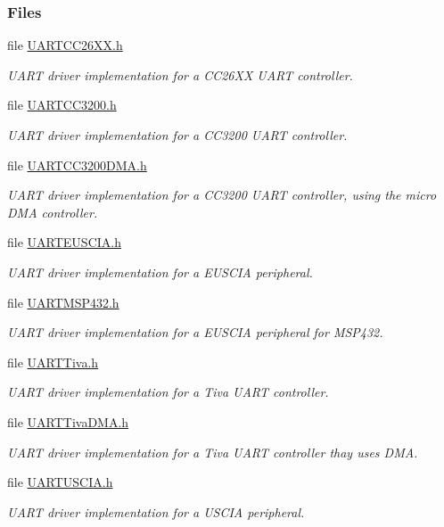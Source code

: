 \subsubsection*{Files}
\begin{DoxyCompactItemize}
\item 
file \hyperlink{_u_a_r_t_c_c26_x_x_8h}{U\+A\+R\+T\+C\+C26\+X\+X.\+h}
\begin{DoxyCompactList}\small\item\em U\+A\+R\+T driver implementation for a C\+C26\+X\+X U\+A\+R\+T controller. \end{DoxyCompactList}\item 
file \hyperlink{_u_a_r_t_c_c3200_8h}{U\+A\+R\+T\+C\+C3200.\+h}
\begin{DoxyCompactList}\small\item\em U\+A\+R\+T driver implementation for a C\+C3200 U\+A\+R\+T controller. \end{DoxyCompactList}\item 
file \hyperlink{_u_a_r_t_c_c3200_d_m_a_8h}{U\+A\+R\+T\+C\+C3200\+D\+M\+A.\+h}
\begin{DoxyCompactList}\small\item\em U\+A\+R\+T driver implementation for a C\+C3200 U\+A\+R\+T controller, using the micro D\+M\+A controller. \end{DoxyCompactList}\item 
file \hyperlink{_u_a_r_t_e_u_s_c_i_a_8h}{U\+A\+R\+T\+E\+U\+S\+C\+I\+A.\+h}
\begin{DoxyCompactList}\small\item\em U\+A\+R\+T driver implementation for a E\+U\+S\+C\+I\+A peripheral. \end{DoxyCompactList}\item 
file \hyperlink{_u_a_r_t_m_s_p432_8h}{U\+A\+R\+T\+M\+S\+P432.\+h}
\begin{DoxyCompactList}\small\item\em U\+A\+R\+T driver implementation for a E\+U\+S\+C\+I\+A peripheral for M\+S\+P432. \end{DoxyCompactList}\item 
file \hyperlink{_u_a_r_t_tiva_8h}{U\+A\+R\+T\+Tiva.\+h}
\begin{DoxyCompactList}\small\item\em U\+A\+R\+T driver implementation for a Tiva U\+A\+R\+T controller. \end{DoxyCompactList}\item 
file \hyperlink{_u_a_r_t_tiva_d_m_a_8h}{U\+A\+R\+T\+Tiva\+D\+M\+A.\+h}
\begin{DoxyCompactList}\small\item\em U\+A\+R\+T driver implementation for a Tiva U\+A\+R\+T controller thay uses D\+M\+A. \end{DoxyCompactList}\item 
file \hyperlink{_u_a_r_t_u_s_c_i_a_8h}{U\+A\+R\+T\+U\+S\+C\+I\+A.\+h}
\begin{DoxyCompactList}\small\item\em U\+A\+R\+T driver implementation for a U\+S\+C\+I\+A peripheral. \end{DoxyCompactList}\end{DoxyCompactItemize}

